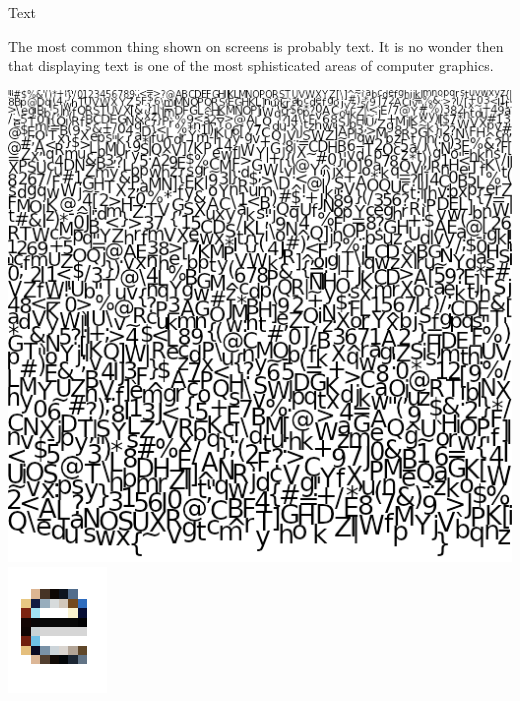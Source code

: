\documentclass{lug}
\newcommand{\splitslide}[4]{
    \noindent
    \begin{minipage}{#1 \textwidth - #2 }
        #3
    \end{minipage}%
    \hspace{ \dimexpr #2 * 2 \relax }%
    \begin{minipage}{\textwidth - #1 \textwidth - #2 }
        #4
    \end{minipage}
}
\begin{document}
\begin{frame}{Text}
    \splitslide{0.65}{.7em}{
        \small

        The most common thing shown on screens is probably text. It is no
        wonder then that displaying text is one of the most sphisticated areas
        of computer graphics.

    }{
        \includegraphics[width=\textwidth]{graphics/freetype_atlas} \\
        \includegraphics[width=\textwidth]{graphics/subpixel_e}
    }
\end{frame}
\end{document}
